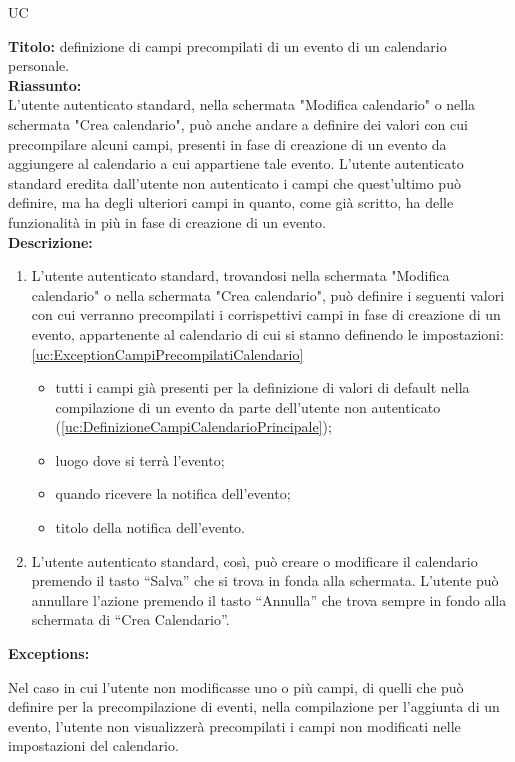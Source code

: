 \begin{listaPersonale}{UC}
\begin{listaPersonale2}[UC] {}
            \textbf{Titolo: } definizione di campi precompilati di un evento di un calendario personale. \\
            \textbf{Riassunto: } \\ L'utente autenticato standard, nella schermata "Modifica calendario" o nella schermata "Crea calendario", può anche andare a definire dei valori con cui precompilare alcuni campi, presenti in fase di creazione di un evento da aggiungere al calendario a cui appartiene tale evento. L'utente autenticato standard eredita dall'utente non autenticato i campi che quest'ultimo può definire, ma ha degli ulteriori campi in quanto, come già scritto, ha delle funzionalità in più in fase di creazione di un evento. \\
            \textbf{Descrizione: } \\
            \begin {enumerate}
        \item L'utente autenticato standard, trovandosi nella schermata "Modifica calendario" o nella schermata "Crea calendario", può definire i seguenti valori con cui verranno precompilati i corrispettivi campi in fase di creazione di un evento, appartenente al calendario di cui si stanno definendo le impostazioni: \ref{uc:ExceptionCampiPrecompilatiCalendario}
              \begin{itemize}
                  \item tutti i campi già presenti per la definizione di valori di default nella compilazione di un evento da parte dell'utente non autenticato (\ref{uc:DefinizioneCampiCalendarioPrincipale});
                  \item luogo dove si terrà l'evento;
                  \item quando ricevere la notifica dell'evento;
                  \item titolo della notifica dell'evento.
              \end{itemize}
        \item L'utente autenticato standard, così, può creare o modificare il calendario premendo il tasto “Salva” che si trova in fonda alla schermata. L'utente può annullare l'azione premendo il tasto “Annulla” che trova sempre in fondo alla schermata di “Crea Calendario”.
              \end{enumerate}
              \textbf{Exceptions:}
              \begin{enumerate}[label=\textbf{[exception \arabic{enumiii}]}, ref= \textbf{[exception \arabic{enumiii}]}]
                   Nel caso in cui l'utente non modificasse uno o più campi, di quelli che può definire per la precompilazione di eventi, nella compilazione per l'aggiunta di un evento, l'utente non visualizzerà precompilati i campi non modificati nelle impostazioni del calendario.
              \end{enumerate}



\end{listaPersonale2}
\end{listaPersonale}
